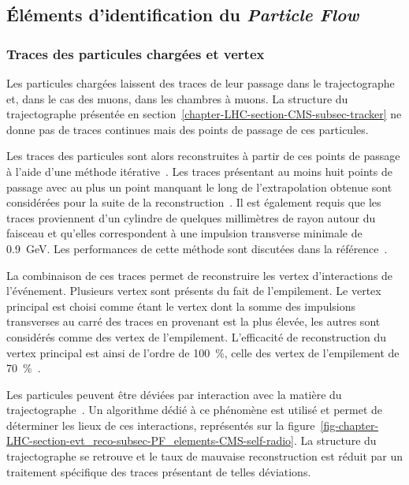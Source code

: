 \subsection{Éléments d'identification du \emph{Particle Flow}}\label{chapter-LHC-section-evt_reco-subsec-PF_elements}
\subsubsection{Traces des particules chargées et vertex}
Les particules chargées laissent des traces de leur passage dans le trajectographe et, dans le cas des muons, dans les chambres à muons.
La structure du trajectographe présentée en section~\ref{chapter-LHC-section-CMS-subsec-tracker} ne donne pas de traces continues mais des points de passage de ces particules.
\par Les traces des particules sont alors reconstruites à partir de ces points de passage à l'aide d'une méthode itérative~\cite{track_reco}.
Les traces présentant au moins huit points de passage avec au plus un point manquant le long de l'extrapolation obtenue sont considérées pour la suite de la reconstruction~\cite{particle-flow}.
Il est également requis que les traces proviennent d'un cylindre de quelques millimètres de rayon autour du faisceau et qu'elles correspondent à une impulsion transverse minimale de \SI{0.9}{\GeV}.
Les performances de cette méthode sont discutées dans la référence~\cite{CMS_TDR_1}.
\par La combinaison de ces traces permet de reconstruire les vertex d'interactions de l'événement.
Plusieurs vertex sont présents du fait de l'empilement.
Le vertex principal est choisi comme étant le vertex dont la somme des impulsions transverses au carré des traces en provenant est la plus élevée, les autres sont considérés comme des vertex de l'empilement.
L'efficacité de reconstruction du vertex principal est ainsi de l'ordre de \SI{100}{\%}, celle des vertex de l'empilement de \SI{70}{\%}~\cite{JERC_RunI}.
\par Les particules peuvent être déviées par interaction avec la matière du trajectographe~\cite{moliere_scat_1,moliere_scat_2}.
Un algorithme dédié à ce phénomène est utilisé et permet de déterminer les lieux de ces interactions, représentés sur la figure~\ref{fig-chapter-LHC-section-evt_reco-subsec-PF_elements-CMS-self-radio}.
La structure du trajectographe se retrouve et le taux de mauvaise reconstruction est réduit par un traitement spécifique des traces présentant de telles déviations.
